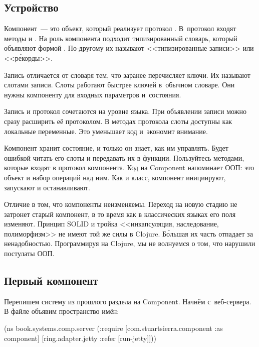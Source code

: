\subsection{Устройство}

\label{defrecord}

Компонент~--- это объект, который реализует протокол . В~протокол
входят методы  и . На роль компонента подходит
типизированный словарь, который объявляют формой . По-другому их
называют <<типизированные записи>> или <<р\'{е}корды>>.


Запись отличается от словаря тем, что заранее перечисляет ключи. Их называют
слотами записи. Слоты работают быстрее ключей в~обычном словаре. Они нужны
компоненту для входных параметров и~состояния.

Запись и протокол сочетаются на уровне языка. При объявлении записи можно сразу
расширить её протоколом. В методах протокола слоты доступны как локальные
переменные. Это уменьшает код и~экономит внимание.


Компонент хранит состояние, и только он знает, как им управлять. Будет ошибкой
читать его слоты и передавать их в функции. Пользуйтесь методами, которые входят
в протокол компонента. Код на Component напоминает ООП: это объект и набор
операций над ним. Как и класс, компонент инициируют, запускают и останавливают.


Отличие в том, что компоненты неизменяемы. Переход на новую стадию не затронет
старый компонент, в то время как в классических языках его поля
изменяют. Принцип SOLID и тройка <<инкапсуляция, наследование, полиморфизм>> не
имеют той же силы в Clojure. Б\'{о}льшая их часть отпадает за
ненадобностью. Программируя на Clojure, мы не волнуемся о том, что нарушили
постулаты ООП.

\subsection{Первый компонент}

Перепишем систему из прошлого раздела на Component. Начнём с~веб-сервера. В
файле  объявим пространство имён:

\ifnarrow

\begin{clojure}
(ns book.systems.comp.server
  (:require
   [com.stuartsierra.component
    :as component]
   [ring.adapter.jetty
    :refer [run-jetty]]))
\end{clojure}

